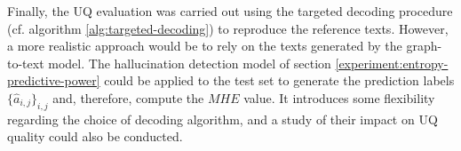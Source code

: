 Finally, the UQ evaluation was carried out using the targeted decoding procedure (cf. algorithm \ref{alg:targeted-decoding}) to reproduce the reference texts. However, a more realistic approach would be to rely on the texts generated by the graph-to-text model. The hallucination detection model of section \ref{experiment:entropy-predictive-power} could be applied to the test set to generate the prediction labels $\{\hat{a}_{i,j}\}_{i,j}$ and, therefore, compute the $MHE$ value. It introduces some flexibility regarding the choice of decoding algorithm, and a study of their impact on UQ quality could also be conducted.  

 

